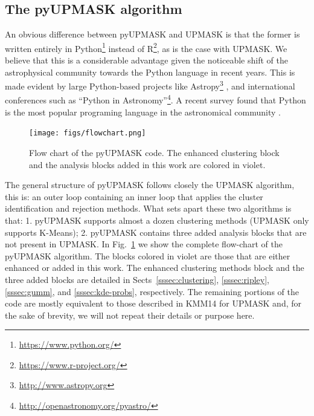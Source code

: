 \documentclass[draft]{aa}
\begin{document}
\subsection{The pyUPMASK algorithm}
 \label{ssec:pyupmask}

  An obvious difference between pyUPMASK and UPMASK is that the former is
  written entirely in Python\footnote{\url{https://www.python.org/}} instead
  of R\footnote{\url{https://www.r-project.org/}}, as is the case with UPMASK.
  We believe that this is a considerable advantage given the noticeable shift
  of the astrophysical community towards the Python language in recent years.
  This is made evident by large Python-based projects like
  Astropy\footnote{\url{http://www.astropy.org}} \citep{astropy:2013,
  astropy:2018},
  and international conferences such as ``Python in
  Astronomy''\footnote{\url{http://openastronomy.org/pyastro/}}. A recent
  survey found that Python is the most popular programing language in the
  astronomical community \citep{Momcheva2015,Tollerud2019SustainingCS}.

  \begin{figure}
   \centering
   \texttt{[image: figs/flowchart.png]}
   \caption{Flow chart of the pyUPMASK code. The enhanced clustering block and
   the analysis blocks added in this work are colored in violet.}
   \label{fig:flowchart}
  \end{figure}

  The general structure of pyUPMASK follows closely the UPMASK algorithm, this
  is: an outer loop containing an inner loop that applies the cluster
  identification and rejection methods. What sets apart these two algorithms
  is that: 1. pyUPMASK supports almost a dozen clustering
  methods (UPMASK only supports K-Means); 2. pyUPMASK contains
  three added analysis blocks that are not present in UPMASK.
  In Fig.~\ref{fig:flowchart} we show the complete flow-chart of the pyUPMASK
  algorithm. The blocks colored in violet are those that are either enhanced or
  added in this work.
  The enhanced clustering methods block and the three added blocks are detailed
  in Sects~\ref{sssec:clustering}, \ref{sssec:ripley},
  \ref{sssec:gumm}, and \ref{sssec:kde-probs}, respectively. The remaining
  portions of the code are mostly equivalent to those described in KMM14 for
  UPMASK and, for the sake of brevity, we will not repeat their details or
  purpose here.
\end{document}
